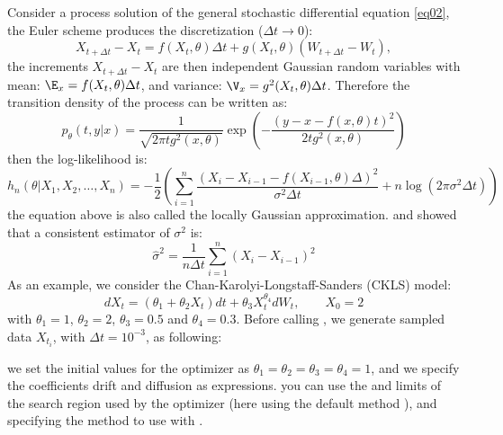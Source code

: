Consider a process solution of the general stochastic differential equation \eqref{eq02}, the Euler scheme produces the discretization ($\Delta t \rightarrow 0$):
\begin{equation*}
X_{t+\Delta t} - X_{t} = f(X_{t},\theta) \Delta t+ g(X_{t},\theta) (W_{t+\Delta t} -W_{t}),
\end{equation*}
the increments $X_{t+\Delta t} - X_{t}$ are then independent Gaussian random variables with mean: $\E_{x} = f(X_{t},\theta)\Delta t$, and variance: $\V_{x} = g^{2}(X_{t},\theta) \Delta t$. Therefore the transition
density of the process can be written as:
\begin{equation*}
  p_{\theta}(t,y|x)=\frac{1}{\sqrt{2\pi t g^{2}(x,\theta)}} \exp\left(-\frac{\left(y-x-f(x,\theta)t\right)^2}{2tg^{2}(x,\theta)}\right)
\end{equation*}
then the log-likelihood is:
\begin{equation}\label{eq08}
  h_{n}(\theta|X_{1},X_{2},\dots,X_{n})=-\frac{1}{2}\left(\sum_{i=1}^{n} \frac{(X_{i}-X_{i-1}-f(X_{i-1},\theta)\Delta)^2}{\sigma^2 \Delta t} + n \log(2\pi \sigma^2 \Delta t)\right)
\end{equation}
the equation above is also called the locally Gaussian approximation. \cite{Florens1989} and \cite{Yoshida1992} showed that a consistent estimator of $\sigma^2$ is:
$$
\hat{\sigma}^2 = \frac{1}{n \Delta t} \sum_{i=1}^{n} (X_{i}-X_{i-1})^2
$$
As an example, we consider the Chan-Karolyi-Longstaff-Sanders (CKLS) model:
\begin{equation}\label{eq09}
  dX_{t} = (\theta_{1}+\theta_{2} X_{t}) dt + \theta_{3} X_{t}^{\theta_{4}} dW_{t},\qquad X_{0}=2
\end{equation}
with $\theta_{1}=1$, $\theta_{2}=2$, $\theta_{3}=0.5$ and $\theta_{4}=0.3$. Before calling , we generate sampled data $X_{t_{i}}$, with $\Delta t =10^{-3}$, as following:
\begin{Schunk}
\end{Schunk}
we set the initial values for the optimizer as $\theta_{1}=\theta_{2}=\theta_{3}=\theta_{4}=1$, and we specify the coefficients drift and diffusion as expressions.
you can use the  and  limits of the search region used by the optimizer (here using the default method ), and specifying the method to use with .
